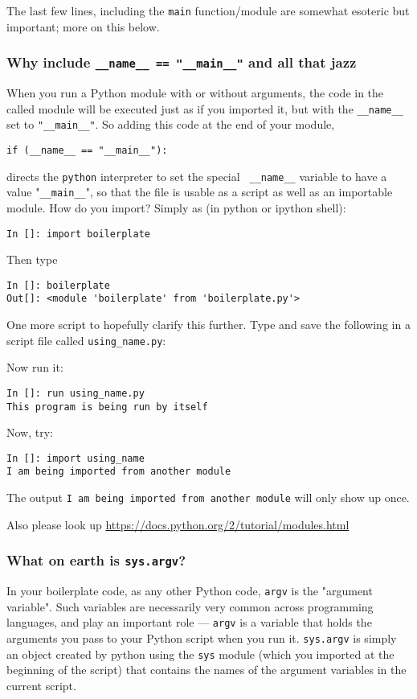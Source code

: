 The last few lines, including the {\tt main} function/module are 
somewhat esoteric but important; more on this below.
 
\subsubsection{Why include {\tt \_\_name\_\_ == "\_\_main\_\_"} and all 
that jazz}

When you run a Python module with or without arguments, the code in the 
called module will be executed just as if you imported it, but with the 
{\tt \_\_name\_\_} set to {\tt "\_\_main\_\_"}. So adding this code 
at the end of your module,
\begin{lstlisting}
if (__name__ == "__main__"):
\end{lstlisting}
directs the {\tt python} interpreter to set the special {\tt 
\_\_name\_\_} variable to have a value "{\tt  \_\_main\_\_}", so that 
the file is usable as a script as well as an importable module. How do 
you import? Simply as (in python or ipython shell):
\begin{lstlisting}
In []: import boilerplate
\end{lstlisting}
Then type 
\begin{lstlisting}
In []: boilerplate
Out[]: <module 'boilerplate' from 'boilerplate.py'>
\end{lstlisting}

One more script to hopefully clarify this further. Type and save the 
following in a script file called {\tt using\_name.py}: 

Now run it:
\begin{lstlisting}
In []: run using_name.py
This program is being run by itself
\end{lstlisting}

Now, try:
\begin{lstlisting}
In []: import using_name
I am being imported from another module
\end{lstlisting}
	
The output {\tt I am being imported from another module} will only 
show up once. 

Also please look up \url{https://docs.python.org/2/tutorial/modules.html}

\subsubsection{What on earth is {\tt sys.argv}?}

In your boilerplate code, as any other Python code, {\tt argv} is the 
"argument variable". Such variables are necessarily very common across 
programming languages, and play an important role --- {\tt argv} is a 
variable that holds the arguments you pass to your Python script when 
you run it. {\tt sys.argv} is simply an object created by python 
using the {\tt sys} module (which you imported at the beginning of the 
script) that contains the names of the argument variables in the 
current script.

